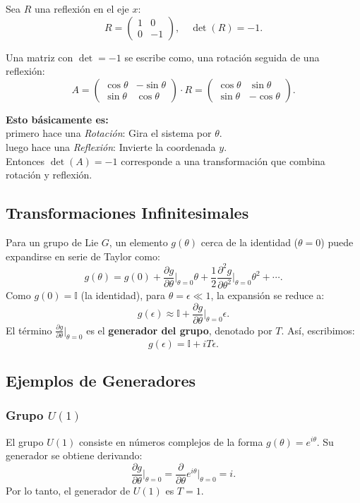 \documentclass[a4paper,12pt]{article}
\begin{document}
{\begin{minipage}{0.75\textwidth}
Sea \( R \) una reflexión en el eje \( x \):
\[
R = \begin{pmatrix}
1 & 0 \\
0 & -1
\end{pmatrix}, \quad \det(R) = -1.
\]

Una matriz con \(\det = -1\) se escribe como, una rotación seguida de una reflexión:
\[
A = \begin{pmatrix}
\cos\theta & -\sin\theta \\
\sin\theta & \cos\theta
\end{pmatrix} \cdot R = \begin{pmatrix}
\cos\theta & \sin\theta \\
\sin\theta & -\cos\theta
\end{pmatrix}.
\]

\textbf{Esto básicamente es:} \\
  primero hace una \textit{Rotación}: Gira el sistema por \(\theta\). \\  
  luego hace una \textit{Reflexión}: Invierte la coordenada \( y \). \\

Entonces \(\det(A) = -1\) corresponde a una transformación que combina rotación y reflexión.
\end{minipage}
}


\subsection{Transformaciones Infinitesimales}
Para un grupo de Lie \( G \), un elemento \( g(\theta) \) cerca de la identidad (\( \theta = 0 \)) puede expandirse en serie de Taylor como:
\[
g(\theta) = g(0) + \frac{\partial g}{\partial \theta} \bigg|_{\theta=0} \theta + \frac{1}{2} \frac{\partial^2 g}{\partial \theta^2} \bigg|_{\theta=0} \theta^2 + \cdots.
\]
Como \( g(0) = \mathbb{I} \) (la identidad), para \( \theta = \epsilon \ll 1 \), la expansión se reduce a:
\[
g(\epsilon) \approx \mathbb{I} + \frac{\partial g}{\partial \theta} \bigg|_{\theta=0} \epsilon.
\]
El término \( \frac{\partial g}{\partial \theta} \big|_{\theta=0} \) es el \textbf{generador del grupo}, denotado por \( T \). Así, escribimos:
\[
g(\epsilon) = \mathbb{I} + i T \epsilon.
\]

\subsection{Ejemplos de Generadores}
\subsubsection{Grupo \( U(1) \)}
El grupo \( U(1) \) consiste en números complejos de la forma \( g(\theta) = e^{i\theta} \). Su generador se obtiene derivando:
\[
\frac{\partial g}{\partial \theta} \bigg|_{\theta=0} = \frac{\partial}{\partial \theta} e^{i\theta} \bigg|_{\theta=0} = i.
\]
Por lo tanto, el generador de \( U(1) \) es \( T = 1 \).
\end{document}

